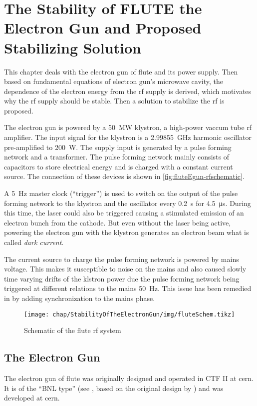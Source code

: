 \chapter{The Stability of FLUTE the Electron Gun and Proposed Stabilizing Solution}
This chapter deals with the electron gun of \gls{flute} and its power supply. Then based on fundamental equations of electron gun's microwave cavity, the dependence of the electron energy from the \gls{rf} supply is derived, which motivates why the \gls{rf} supply should be stable. Then a solution to stabilize the \gls{rf} is proposed.

The electron gun is powered by a \SI{50}{\MW} klystron, a high-power vaccum tube \gls{rf} amplifier. The input signal for the klystron is a \SI{2.99855}{\GHz} harmonic oscillator pre-amplified to \SI{200}{\watt}. The supply input is generated by a pulse forming network and a transformer. The pulse forming network mainly consists of capacitors to store electrical energy and is charged with a constant current source. The connection of these devices is shown in \autoref{fig:fluteEgun-rfschematic}.

A \SI{5}{\hertz} master clock (``trigger'') is used to switch on the output of the pulse forming network to the klystron and the oscillator every \SI{0.2}{\second} for \SI{4.5}{\micro\second}. During this time, the laser could also be triggered causing a stimulated emission of an electron bunch from the cathode. But even without the laser being active, powering the electron gun with the klystron generates an electron beam what is called \textit{dark current}.

The current source to charge the pulse forming network is powered by mains voltage. This makes it susceptible to noise on the mains and also caused slowly time varying drifts of the klstron power due the pulse forming network being triggered at different relations to the mains \SI{50}{\hertz}. This issue has been remedied in \cite{Nasse2019} by adding synchronization to the mains phase.

\begin{figure}[tb]
	\centering
	\texttt{[image: chap/StabilityOfTheElectronGun/img/fluteSchem.tikz]}
	\caption{Schematic of the \gls{flute} \gls{rf} system}
	\label{fig:fluteEgun-rfschematic}
\end{figure}

\section{The Electron Gun}
The electron gun of \gls{flute} was originally designed and operated in CTF II at \gls{cern}. \cite{Schuh2014}
It is of the ``BNL type'' (see \cite{Batchelor1988}, based on the original design by \cite{fraser1987}) and was  developed at \gls{cern}. \cite{Bossart:288412}

